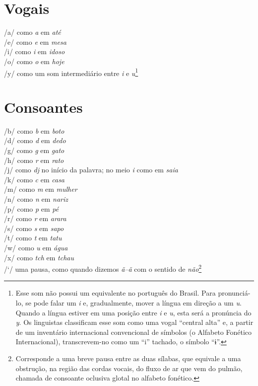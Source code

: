 \section{Vogais}

/a/  como \textit{a} em \textit{até}\\
/e/  como \textit{e} em \textit{mesa}\\
/i/  como \textit{i} em \textit{idoso}\\
/o/  como \textit{o} em \textit{hoje}\\
/y/  como um som intermediário entre \textit{i} e \textit{u}\footnote{Esse som não possui um
equivalente no português do Brasil. Para pronunciá-lo, se pode falar um
\textit{i} e, gradualmente, mover a língua em direção a um \textit{u}. Quando a
língua estiver em uma posição entre \textit{i} e \textit{u}, esta será a pronúncia
do \textit{y}. Os linguistas classificam esse som como uma vogal ``central alta'' e, a partir de um inventário internacional convencional de símbolos (o Alfabeto Fonético Internacional), transcrevem-no como um ``i'' tachado, o símbolo ``ɨ''.}\\

\section{Consoantes}

/b/  como \textit{b} em \textit{boto}\\
/d/  como \textit{d} em \textit{dedo}\\
/g/  como \textit{g} em \textit{gato}\\
/h/  como \textit{r} em \textit{rato}\\
/j/  como \textit{dj} no início da palavra; no meio \textit{i} como em \textit{saia}\\
/k/  como \textit{c} em \textit{casa}\\
/m/  como \textit{m} em \textit{mulher}\\
/n/  como \textit{n} em \textit{nariz}\\
/p/  como \textit{p} em \textit{pé}\\
/r/  como \textit{r} em \textit{arara}\\
/s/  como \textit{s} em \textit{sapo}\\
/t/  como \textit{t} em \textit{tatu}\\
/w/  como \textit{u} em \textit{água}\\
/x/  como \textit{tch} em \textit{tchau}\\
/`/  uma pausa, como quando dizemos \textit{ã--ã} com o sentido de \textit{não}\footnote{Corresponde a uma breve pausa entre as duas sílabas, que equivale a uma obstrução, na região das cordas vocais, do fluxo de ar que vem do pulmão, chamada de consoante oclusiva glotal no alfabeto fonético.}\\





